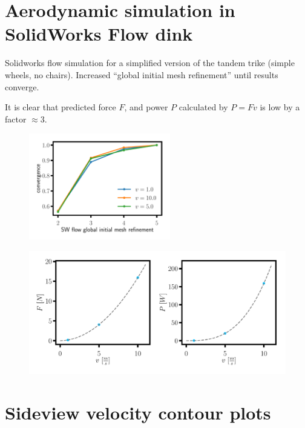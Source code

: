 \documentclass[11pt]{article}
\begin{document}
\section*{Aerodynamic simulation in SolidWorks Flow dink}

Solidworks flow simulation for a simplified version of the tandem trike (simple wheels, no chairs).
Increased ``global initial mesh refinement'' until results converge.

It is clear that predicted force $F$, and power $P$ calculated by $P = F v$ is low by a factor $\approx 3$. 


\begin{figure}[h!]
\centering
\includegraphics[width=0.55\textwidth]{convergence.pdf}
\end{figure}

\begin{figure}[h!]
\centering
\includegraphics[width=\textwidth]{ForcePower.pdf}
\end{figure}

\section*{Sideview velocity contour plots}
\end{document}
